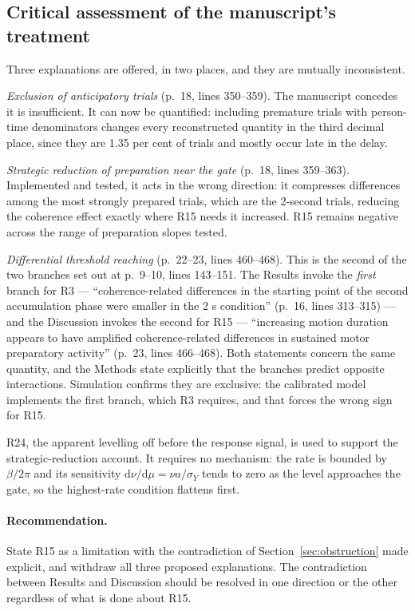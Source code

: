 \documentclass[11pt,a4paper]{article}
\newcommand{\dd}{\mathrm{d}}
\theoremstyle{plain}
\theoremstyle{remark}
\begin{document}
\subsection{Critical assessment of the manuscript's treatment}

Three explanations are offered, in two places, and they are mutually inconsistent.

\emph{Exclusion of anticipatory trials} (p.~18, lines 350--359). The manuscript concedes it
is insufficient. It can now be quantified: including premature trials with person-time
denominators changes every reconstructed quantity in the third decimal place, since they are
1.35 per cent of trials and mostly occur late in the delay.

\emph{Strategic reduction of preparation near the gate} (p.~18, lines 359--363). Implemented
and tested, it acts in the wrong direction: it compresses differences among the most
strongly prepared trials, which are the 2-second trials, reducing the coherence effect
exactly where R15 needs it increased. R15 remains negative across the range of preparation
slopes tested.

\emph{Differential threshold reaching} (p.~22--23, lines 460--468). This is the second of
the two branches set out at p.~9--10, lines 143--151. The Results invoke the \emph{first}
branch for R3 --- ``coherence-related differences in the starting point of the second
accumulation phase were smaller in the 2 s condition'' (p.~16, lines 313--315) --- and the
Discussion invokes the second for R15 --- ``increasing motion duration appears to have
amplified coherence-related differences in sustained motor preparatory activity'' (p.~23,
lines 466--468). Both statements concern the same quantity, and the Methods state explicitly
that the branches predict opposite interactions. Simulation confirms they are exclusive: the
calibrated model implements the first branch, which R3 requires, and that forces the wrong
sign for R15.

R24, the apparent levelling off before the response signal, is used to support the
strategic-reduction account. It requires no mechanism: the rate is bounded by $\beta/2\pi$
and its sensitivity $\dd\nu/\dd\mu=\nu a/\sigma_Y$ tends to zero as the level approaches the
gate, so the highest-rate condition flattens first.

\paragraph{Recommendation.} State R15 as a limitation with the contradiction of
Section~\ref{sec:obstruction} made explicit, and withdraw all three proposed explanations.
The contradiction between Results and Discussion should be resolved in one direction or the
other regardless of what is done about R15.
\end{document}
